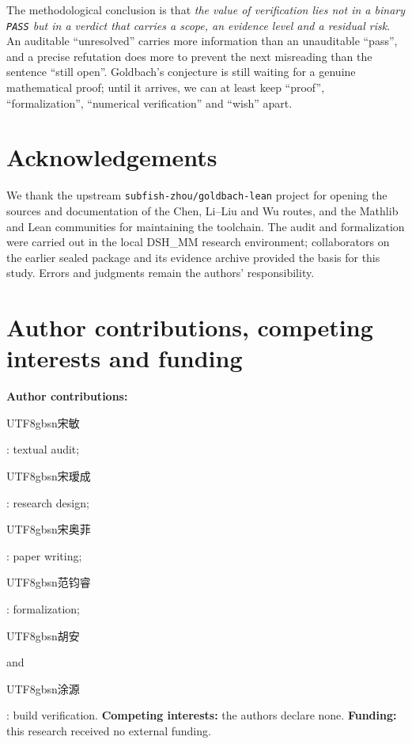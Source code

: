 \documentclass[11pt,a4paper]{article}
\theoremstyle{plain}
\theoremstyle{definition}
\begin{document}
The methodological conclusion is that \emph{the value of verification lies not in a binary \texttt{PASS} but in a verdict that carries a scope, an evidence level and a residual risk}. An auditable ``unresolved'' carries more information than an unauditable ``pass'', and a precise refutation does more to prevent the next misreading than the sentence ``still open''. Goldbach's conjecture is still waiting for a genuine mathematical proof; until it arrives, we can at least keep ``proof'', ``formalization'', ``numerical verification'' and ``wish'' apart.

\section*{Acknowledgements}
We thank the upstream \texttt{subfish-zhou/goldbach-lean} project for opening the sources and documentation of the Chen, Li--Liu and Wu routes, and the Mathlib and Lean communities for maintaining the toolchain. The audit and formalization were carried out in the local DSH\_MM research environment; collaborators on the earlier sealed package and its evidence archive provided the basis for this study. Errors and judgments remain the authors' responsibility.

\section*{Author contributions, competing interests and funding}
\textbf{Author contributions:} \begin{CJK}{UTF8}{gbsn}宋敏\end{CJK}: textual audit; \begin{CJK}{UTF8}{gbsn}宋瑷成\end{CJK}: research design; \begin{CJK}{UTF8}{gbsn}宋奥菲\end{CJK}: paper writing; \begin{CJK}{UTF8}{gbsn}范钧睿\end{CJK}: formalization; \begin{CJK}{UTF8}{gbsn}胡安\end{CJK} and \begin{CJK}{UTF8}{gbsn}涂源\end{CJK}: build verification. \textbf{Competing interests:} the authors declare none. \textbf{Funding:} this research received no external funding.
\end{document}
